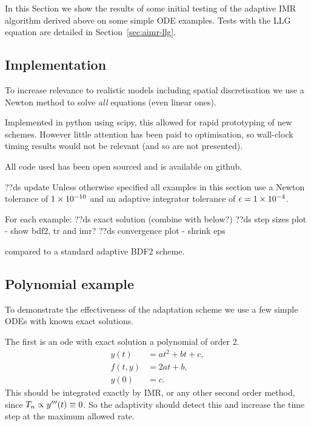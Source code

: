 In this Section we show the results of some initial testing of the adaptive IMR algorithm derived above on some simple ODE examples.
Tests with the LLG equation are detailed in Section~\ref{sec:aimr-llg}.


\subsection{Implementation}
\label{sec:aimr-implementation}

To increase relevance to realistic models including spatial discretisation we use a Newton method to solve \emph{all} equations (even linear ones).

Implemented in python using scipy, this allowed for rapid prototyping of new schemes. However little attention has been paid to optimisation, so wall-clock timing results would not be relevant (and so are not presented).

All code used has been open sourced and is available on github.\cite{simple-ode-github}


??ds update
Unless otherwise specified all examples in this section use a Newton tolerance of $1\times 10^{-10}$ and an adaptive integrator tolerance of $\epsilon = 1\times 10^{-4}$.

For each example:
??ds exact solution (combine with below?)
??ds step sizes plot - show bdf2, tr and imr?
??ds convergence plot - shrink eps

compared to a standard adaptive BDF2 scheme.\cite[pg. 715]{Gresho-Sani}

\subsection{Polynomial example}
\label{sec:imr-polynomial-example}

To demonstrate the effectiveness of the adaptation scheme we use a few simple ODEs with known exact solutions.

The first is an ode with exact solution a polynomial of order 2.
\begin{equation}
  \label{eqn:imr-test-poly2}
  \begin{aligned}
    y(t) &= at^2 + bt + c, \\
    f(t,y) &= 2at + b, \\
    y(0) & = c.
  \end{aligned}
\end{equation} 
This should be integrated exactly by IMR, or any other second order method, since $T_n \propto y'''(t) \equiv 0$.
So the adaptivity should detect this and increase the time step at the maximum allowed rate.

